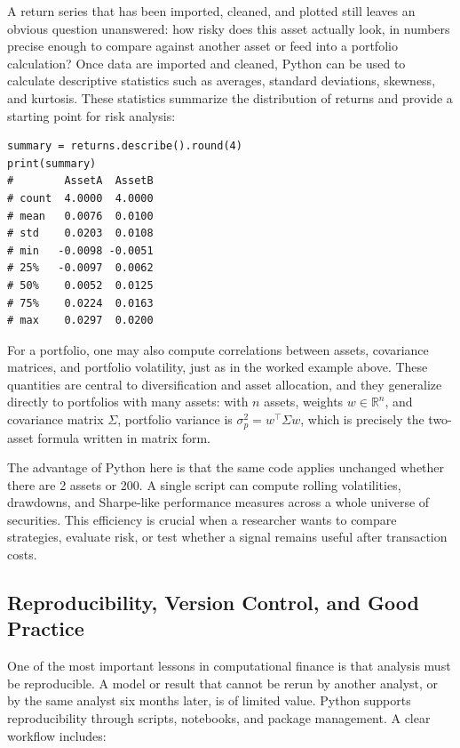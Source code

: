 \documentclass[../ai_in_finance]{subfiles}
\begin{document}
A return series that has been imported, cleaned, and plotted still leaves an obvious question unanswered: how risky does this asset actually look, in numbers precise enough to compare against another asset or feed into a portfolio calculation? Once data are imported and cleaned, Python can be used to calculate descriptive statistics such as averages, standard deviations, skewness, and kurtosis. These statistics summarize the distribution of returns and provide a starting point for risk analysis:

\begin{verbatim}
summary = returns.describe().round(4)
print(summary)
#        AssetA  AssetB
# count  4.0000  4.0000
# mean   0.0076  0.0100
# std    0.0203  0.0108
# min   -0.0098 -0.0051
# 25%   -0.0097  0.0062
# 50%    0.0052  0.0125
# 75%    0.0224  0.0163
# max    0.0297  0.0200
\end{verbatim}

For a portfolio, one may also compute correlations between assets, covariance matrices, and portfolio volatility, just as in the worked example above. These quantities are central to diversification and asset allocation, and they generalize directly to portfolios with many assets: with $n$ assets, weights $w \in \mathbb{R}^n$, and covariance matrix $\Sigma$, portfolio variance is $\sigma_p^2 = w^\top \Sigma w$, which is precisely the two-asset formula written in matrix form.

The advantage of Python here is that the same code applies unchanged whether there are 2 assets or 200. A single script can compute rolling volatilities, drawdowns, and Sharpe-like performance measures across a whole universe of securities. This efficiency is crucial when a researcher wants to compare strategies, evaluate risk, or test whether a signal remains useful after transaction costs.

\subsection{Reproducibility, Version Control, and Good Practice}

One of the most important lessons in computational finance is that analysis must be reproducible. A model or result that cannot be rerun by another analyst, or by the same analyst six months later, is of limited value. Python supports reproducibility through scripts, notebooks, and package management. A clear workflow includes:
\end{document}

